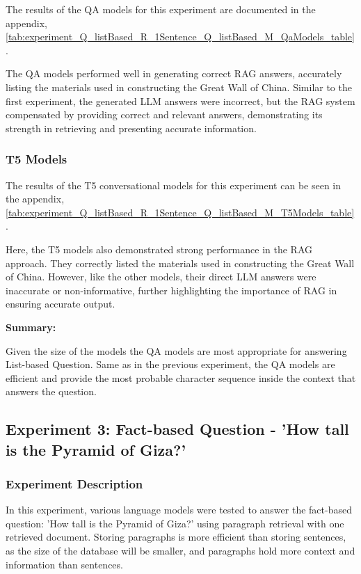 \documentclass{wseas}
\begin{document}
The results of the QA models for this experiment are documented in the appendix, \autoref{tab:experiment_Q_listBased_R_1Sentence_Q_listBased_M_QaModels_table}.

The QA models performed well in generating correct RAG answers, accurately listing the materials used in constructing the Great Wall of China. 
Similar to the first experiment, the generated LLM answers were incorrect, but the RAG system compensated by providing correct and relevant answers,
demonstrating its strength in retrieving and presenting accurate information.

\subsubsection{T5 Models}


The results of the T5 conversational models for this experiment can be seen 
in the appendix, \autoref{tab:experiment_Q_listBased_R_1Sentence_Q_listBased_M_T5Models_table}.

Here, the T5 models also demonstrated strong performance in the RAG approach.
They correctly listed the materials used in constructing the Great Wall of China.
However, like the other models, their direct LLM answers were inaccurate or non-informative,
further highlighting the importance of RAG in ensuring accurate output.

\textbf{Summary:}

Given the size of the models the QA models are most appropriate for
answering List-based Question. Same as in the previous experiment, the QA models are efficient and
provide the most probable character sequence inside the context that answers the question.

\subsection{Experiment 3: Fact-based Question - 'How tall is the Pyramid of Giza?'}

\subsubsection{Experiment Description}

In this experiment, various language models were tested to answer the
fact-based question: 'How tall is the Pyramid of Giza?' using paragraph
retrieval with one retrieved document. Storing paragraphs is more 
efficient than storing sentences, as the size of the database will
be smaller, and paragraphs hold more context and information than sentences.
\end{document}
